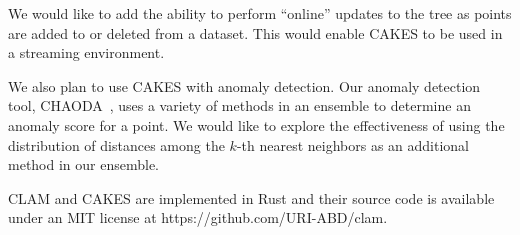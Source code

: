 We would like to add the ability to perform ``online'' updates to the tree as points are added to or deleted from a dataset.
This would enable CAKES to be used in a streaming environment.

We also plan to use CAKES with anomaly detection.
Our anomaly detection tool, CHAODA~\cite{ishaq2021clustered}, uses a variety of methods in an ensemble to determine an anomaly score for a point.
We would like to explore the effectiveness of using the distribution of distances among the $k$-th nearest neighbors as an additional method in our ensemble.

CLAM and CAKES are implemented in Rust and their source code is available under an MIT license at https://github.com/URI-ABD/clam.

